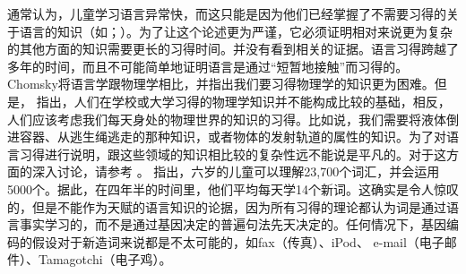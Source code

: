通常认为，儿童学习语言异常快，而这只能是因为他们已经掌握了不需要习得的关于语言的知识（如\citealp[]{Chomsky76c-u}；\citealp[]{Hornstein2013a}）。为了让这个论述更为严谨，它必须证明相对来说更为复杂的其他方面的知识需要更长的习得时间\citep[--218]{Sampson89a}。并没有看到相关的证据。语言习得跨越了多年的时间，而且不可能简单地证明语言是通过“短暂地接触”而习得的。Chomsky将语言学跟物理学相比，并指出我们要习得物理学的知识更为困难。但是， \citet[]{Sampson89a}指出，人们在学校或大学习得的物理学知识并不能构成比较的基础，相反，人们应该考虑我们每天身处的物理世界的知识的习得。比如说，我们需要将液体倒进容器、从逃生绳逃走的那种知识，或者物体的发射轨道的属性的知识。为了对语言习得进行说明，跟这些领域的知识相比较的复杂性远不能说是平凡的。对于这方面的深入讨论，请参考 。 \citet[]{MR98a-u}指出，六岁的儿童可以理解23,700个词汇，并会运用5000个。据此，在四年半的时间里，他们平均每天学14个新词。这确实是令人惊叹的，但是不能作为天赋的语言知识的论据，因为所有习得的理论都认为词是通过语言事实学习的，而不是通过基因决定的普遍句法先天决定的。任何情况下，基因编码的假设对于新造词来说都是不太可能的，如fax（传真）、iPod、 e-mail（电子邮件）、Tamagotchi（电子鸡）。
